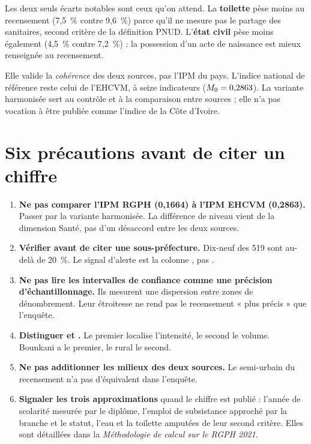 \documentclass[11pt,a4paper]{article}
\begin{document}
Les deux seuls écarts notables sont ceux qu'on attend. La \textbf{toilette} pèse moins au
recensement (7,5~\% contre 9,6~\%) parce qu'il ne mesure pas le partage des sanitaires, second
critère de la définition PNUD. L'\textbf{état civil} pèse moins également (4,5~\% contre 7,2~\%) :
la possession d'un acte de naissance est mieux renseignée au recensement.

\begin{attention}
Elle valide la \emph{cohérence} des deux sources, pas l'IPM du pays. L'indice national de référence
reste celui de l'EHCVM, à seize indicateurs ($M_{0} = 0{,}2863$). La variante harmonisée sert au
contrôle et à la comparaison entre sources ; elle n'a pas vocation à être publiée comme l'indice
de la Côte d'Ivoire.
\end{attention}

\section{Six précautions avant de citer un chiffre}

\begin{enumerate}
  \item \textbf{Ne pas comparer l'IPM RGPH (0,1664) à l'IPM EHCVM (0,2863).} Passer par la variante
        harmonisée. La différence de niveau vient de la dimension Santé, pas d'un désaccord entre
        les deux sources.

  \item \textbf{Vérifier  avant de citer une sous-préfecture.} Dix-neuf des 519 sont
        au-delà de 20~\%. Le signal d'alerte est la colonne , pas .

  \item \textbf{Ne pas lire les intervalles de confiance comme une précision d'échantillonnage.}
        Ils mesurent une dispersion entre zones de dénombrement. Leur étroitesse ne rend pas le
        recensement « plus précis » que l'enquête.

  \item \textbf{Distinguer \ipm{} et .} Le premier localise l'intensité, le
        second le volume. Bounkani a le premier, le rural le second.

  \item \textbf{Ne pas additionner les milieux des deux sources.} Le semi-urbain du recensement n'a
        pas d'équivalent dans l'enquête.

  \item \textbf{Signaler les trois approximations} quand le chiffre est publié : l'année de
        scolarité mesurée par le diplôme, l'emploi de subsistance approché par la branche et le
        statut, l'eau et la toilette amputées de leur second critère. Elles sont détaillées dans la
        \emph{Méthodologie de calcul sur le RGPH 2021}.
\end{enumerate}
\end{document}
